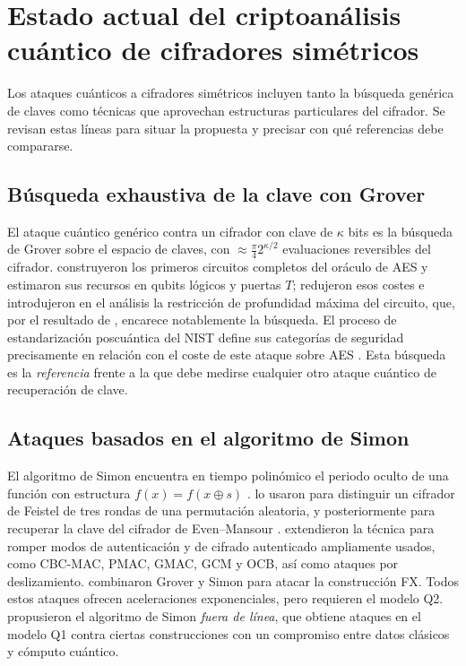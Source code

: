 \section{Estado actual del criptoanálisis cuántico de cifradores simétricos}
\label{sec:estado}

Los ataques cuánticos a cifradores simétricos incluyen tanto la búsqueda genérica de claves como técnicas que aprovechan estructuras particulares del cifrador. Se revisan estas líneas para situar la propuesta y precisar con qué referencias debe compararse.

\subsection{Búsqueda exhaustiva de la clave con Grover}

El ataque cuántico genérico contra un cifrador con clave de \(\kappa\) bits es la búsqueda de Grover sobre el espacio de claves, con \(\approx\frac{\pi}{4}2^{\kappa/2}\) evaluaciones reversibles del cifrador. \citet{grassl2016} construyeron los primeros circuitos completos del oráculo de AES y estimaron sus recursos en qubits lógicos y puertas \(T\); \citet{jaques2020} redujeron esos costes e introdujeron en el análisis la restricción de profundidad máxima del circuito, que, por el resultado de \citet{zalka1999}, encarece notablemente la búsqueda. El proceso de estandarización poscuántica del NIST define sus categorías de seguridad precisamente en relación con el coste de este ataque sobre AES \citep{nist2016}. Esta búsqueda es la \emph{referencia} frente a la que debe medirse cualquier otro ataque cuántico de recuperación de clave.

\subsection{Ataques basados en el algoritmo de Simon}

El algoritmo de Simon encuentra en tiempo polinómico el periodo oculto de una función con estructura \(f(x)=f(x\oplus s)\) \citep{simon1997}. \citet{kuwakado2010} lo usaron para distinguir un cifrador de Feistel de tres rondas de una permutación aleatoria, y posteriormente para recuperar la clave del cifrador de Even--Mansour \citep{kuwakado2012}. \citet{kaplan2016simon} extendieron la técnica para romper modos de autenticación y de cifrado autenticado ampliamente usados, como CBC-MAC, PMAC, GMAC, GCM y OCB, así como ataques por deslizamiento. \citet{leander2017} combinaron Grover y Simon para atacar la construcción FX. Todos estos ataques ofrecen aceleraciones exponenciales, pero requieren el modelo Q2. \citet{bonnetain2019} propusieron el algoritmo de Simon \emph{fuera de línea}, que obtiene ataques en el modelo Q1 contra ciertas construcciones con un compromiso entre datos clásicos y cómputo cuántico.

